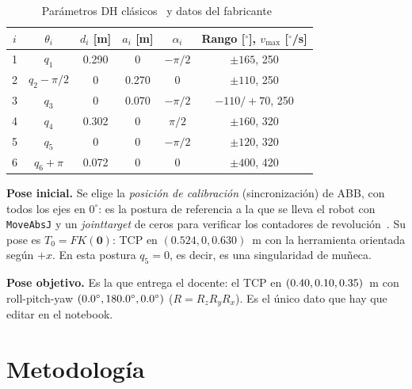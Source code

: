 \documentclass[conference]{IEEEtran}
\begin{document}
\begin{table}[t]
\centering
\caption{Parámetros DH clásicos~\cite{bahani} y datos del fabricante~\cite{abb}}
\label{tab:dh}
\small
\begin{tabular}{@{}cccccc@{}}
\toprule
$i$ & $\theta_i$ & $d_i$ [m] & $a_i$ [m] & $\alpha_i$ & Rango [$^\circ$], $v_{\max}$ [$^\circ$/s]\\
\midrule
1 & $q_1$ & 0.290 & 0 & $-\pi/2$ & $\pm165$, 250\\
2 & $q_2-\pi/2$ & 0 & 0.270 & 0 & $\pm110$, 250\\
3 & $q_3$ & 0 & 0.070 & $-\pi/2$ & $-110/+70$, 250\\
4 & $q_4$ & 0.302 & 0 & $\pi/2$ & $\pm160$, 320\\
5 & $q_5$ & 0 & 0 & $-\pi/2$ & $\pm120$, 320\\
6 & $q_6+\pi$ & 0.072 & 0 & 0 & $\pm400$, 420\\
\bottomrule
\end{tabular}
\end{table}

\textbf{Pose inicial.} Se elige la \emph{posición de calibración} (sincronización) de ABB, con todos los ejes en
$0^\circ$: es la postura de referencia a la que se lleva el robot con \texttt{MoveAbsJ} y un \textit{jointtarget} de
ceros para verificar los contadores de revolución~\cite{abbcal}. Su pose es
$T_0 = FK(\mathbf{0})$: TCP en $(0.524, 0, 0.630)$~m con la herramienta orientada según $+x$. En esta postura
$q_5 = 0$, es decir, es una singularidad de muñeca.

\textbf{Pose objetivo.} Es la que entrega el docente: el TCP en $(0.40, 0.10, 0.35)$~m con roll-pitch-yaw
$(0.0^\circ, 180.0^\circ, 0.0^\circ)$ ($R = R_z R_y R_x$). Es el único dato que hay que editar en el notebook.

\section{Metodología}
\end{document}
